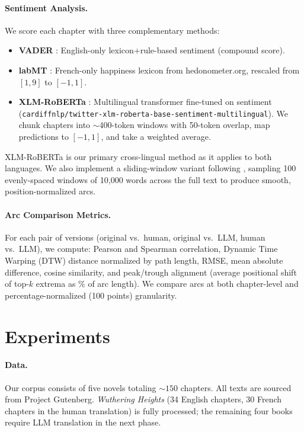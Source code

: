 \documentclass[11pt,a4paper]{article}
\begin{document}
\paragraph{Sentiment Analysis.}
We score each chapter with three complementary methods:
\begin{itemize}
\setlength\itemsep{0pt}
    \item \textbf{VADER} \cite{hutto2014vader}: English-only lexicon+rule-based sentiment (compound score).
    \item \textbf{labMT} \cite{dodds2011temporal}: French-only happiness lexicon from hedonometer.org, rescaled from $[1,9]$ to $[-1,1]$.
    \item \textbf{XLM-RoBERTa} \cite{barbieri2022xlmtwitter}: Multilingual transformer fine-tuned on sentiment (\texttt{cardiffnlp/twitter-xlm-roberta-base-sentiment-multilingual}). We chunk chapters into ${\sim}400$-token windows with 50-token overlap, map predictions to $[-1,1]$, and take a weighted average.
\end{itemize}
XLM-RoBERTa is our primary cross-lingual method as it applies to both languages.
We also implement a sliding-window variant following \citet{reagan2016emotional}, sampling 100 evenly-spaced windows of 10{,}000 words across the full text to produce smooth, position-normalized arcs.

\paragraph{Arc Comparison Metrics.}
For each pair of versions (original vs.\ human, original vs.\ LLM, human vs.\ LLM), we compute:
Pearson and Spearman correlation, Dynamic Time Warping (DTW) distance normalized by path length, RMSE, mean absolute difference, cosine similarity, and peak/trough alignment (average positional shift of top-$k$ extrema as \% of arc length).
We compare arcs at both chapter-level and percentage-normalized (100 points) granularity.

\section{Experiments}

\paragraph{Data.}
Our corpus consists of five novels totaling ${\sim}150$ chapters.
All texts are sourced from Project Gutenberg.
\textit{Wuthering Heights} (34 English chapters, 30 French chapters in the human translation) is fully processed; the remaining four books require LLM translation in the next phase.
\end{document}
